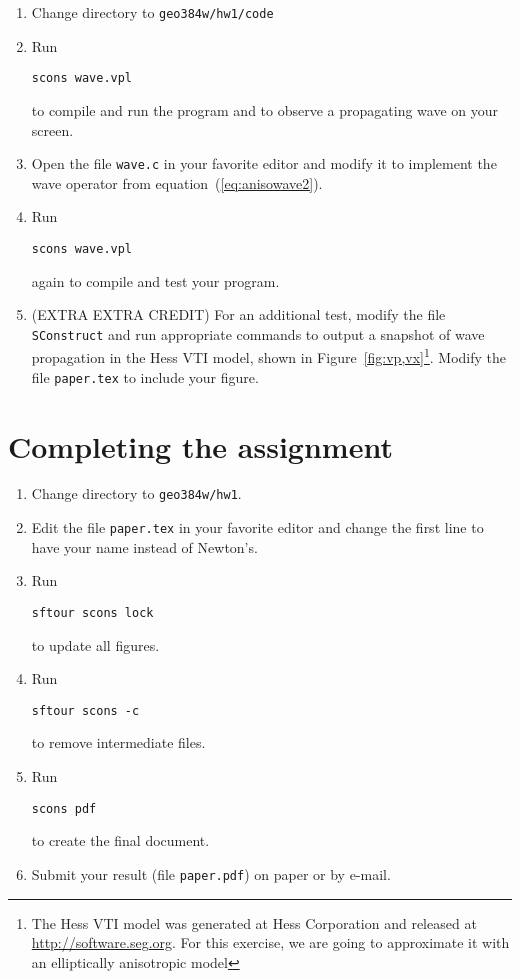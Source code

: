 \begin{enumerate}
\item Change directory to \verb#geo384w/hw1/code#
\item Run
\begin{verbatim}
scons wave.vpl
\end{verbatim}
to compile and run the program and to observe a propagating wave on your screen.
\item Open the file \texttt{wave.c} in your favorite editor and modify it to implement the wave operator from equation~(\ref{eq:anisowave2}).
\item Run
\begin{verbatim}
scons wave.vpl
\end{verbatim}
again to compile and test your program. 
\item (EXTRA EXTRA CREDIT) For an additional test, modify the file \texttt{SConstruct} and run appropriate commands to output a snapshot of wave propagation in the Hess VTI model, shown in Figure~\ref{fig:vp,vx}\footnote{The Hess VTI model was generated at Hess Corporation and released at \url{http://software.seg.org}. For this exercise, we are going to approximate it with an elliptically anisotropic model}. Modify the file \texttt{paper.tex} to include your figure.
\end{enumerate}


\lstset{language=python,numbers=left,numberstyle=\tiny,showstringspaces=false}


\newpage

\section{Completing the assignment}

\begin{enumerate}
\item Change directory to \verb#geo384w/hw1#.
\item Edit the file \texttt{paper.tex} in your favorite editor and change the
first line to have your name instead of Newton's.
\item Run
\begin{verbatim}
sftour scons lock
\end{verbatim}
to update all figures.
\item Run
\begin{verbatim}
sftour scons -c
\end{verbatim}
  to remove intermediate files.
\item Run
\begin{verbatim} 
scons pdf
\end{verbatim}
to create the final document.
\item Submit your result (file \texttt{paper.pdf}) on paper or by
e-mail.
\end{enumerate}



